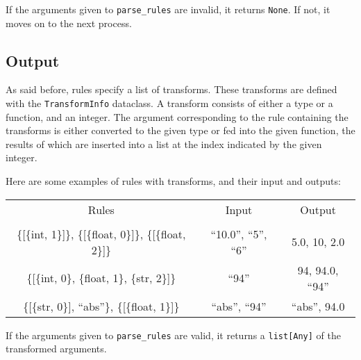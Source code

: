 \documentclass{article}
\begin{document}
				If the arguments given to \verb|parse_rules| are invalid, it returns \verb|None|.
				If not, it moves on to the next process.

		\subsection{Output}
			As said before, rules specify a list of transforms. These transforms are defined
			with the \verb|TransformInfo| dataclass. A transform consists of either a type or
			a function, and an integer. The argument corresponding to the rule containing the
			transforms is either converted to the given type or fed into the given function,
			the results of which are inserted into a list at the index indicated by the given
			integer.

			Here are some examples of rules with transforms, and their input and outputs:

			\begin{center}
				\begin{tabular}{c c c}
					Rules & Input & Output \\
					\\
						\{[\{int, 1\}]\}, \{[\{float, 0\}]\}, \{[\{float, 2\}]\} &
						``10.0'', ``5'', ``6'' &
						5.0, 10, 2.0
					\\
						\{[\{int, 0\}, \{float, 1\}, \{str, 2\}]\} &
						``94'' &
						94, 94.0, ``94''
					\\
						\{[\{str, 0\}], ``abs''\}, \{[\{float, 1\}]\} &
						``abs'', ``94'' &
						``abs'', 94.0
					\\
				\end{tabular}
			\end{center}

			If the arguments given to \verb|parse_rules| are valid, it returns a \verb|list[Any]|
			of the transformed arguments.
\end{document}
